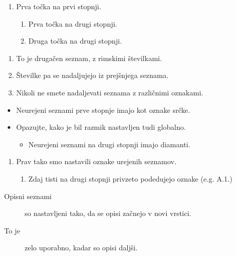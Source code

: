 \documentclass{article}
\begin{document}
\vspace{2cm}

\begin{enumerate}[label=\arabic*.]
  \item  Prva točka na prvi stopnji.
    \begin{enumerate}[label*=\Alph*.]
      \item Prva točka na drugi stopnji.
      \item Druga točka na drugi stopnji.
    \end{enumerate}
\end{enumerate}

\begin{enumerate}[label=\Roman*., resume]
  \item To je drugačen seznam, z rimskimi številkami.
  \item Številke pa se nadaljujejo iz prejšnjega seznama.
  \item Nikoli ne smete nadaljevati seznama z različnimi oznakami.
\end{enumerate}


\clearpage

\begin{itemize}
  \item Neurejeni seznami prve stopnje imajo kot oznake srčke.
  \item Opazujte, kako je bil razmik nastavljen tudi globalno.
  \begin{itemize}
    \item Neurejeni seznami na drugi stopnji imajo diamanti.
  \end{itemize}
\end{itemize}

\vspace{2cm}

\begin{enumerate}
  \item  Prav tako smo nastavili oznake urejenih seznamov.
  \begin{enumerate}
    \item Zdaj tisti na drugi stopnji privzeto podedujejo oznake (e.g. A.1.)
  \end{enumerate}
\end{enumerate}

\vspace{2cm}

\begin{description}
  \item[Opisni seznami] so nastavljeni tako, da se opisi začnejo v novi vrstici.
  \item[To je] zelo uporabno, kadar so opisi daljši.
\end{description}
\end{document}
